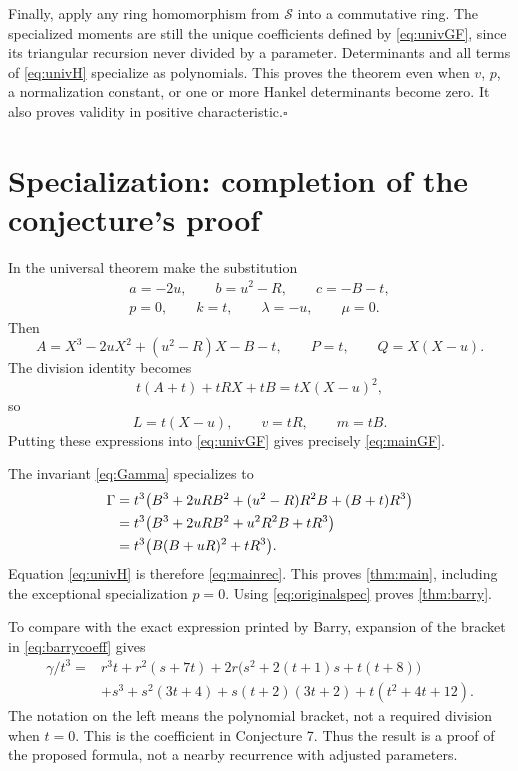 \documentclass[11pt,a4paper]{article}
\numberwithin{equation}{section}
\theoremstyle{definition}
\begin{document}
Finally, apply any ring homomorphism from $\mathcal S$ into a commutative
ring. The specialized moments are still the unique coefficients defined by
\eqref{eq:univGF}, since its triangular recursion never divided by a
parameter. Determinants and all terms of \eqref{eq:univH} specialize as
polynomials. This proves the theorem even when $v$, $p$, a normalization
constant, or one or more Hankel determinants become zero. It also proves
validity in positive characteristic.\hfill$\square$

\section{Specialization: completion of the conjecture's proof}

In the universal theorem make the substitution
\begin{equation}\label{eq:bigSpec}
 \begin{gathered}
 a=-2u,\qquad b=u^2-R,\qquad c=-B-t,\\
 p=0,\qquad k=t,\qquad\lambda=-u,\qquad\mu=0.
 \end{gathered}
\end{equation}
Then
\[
 A=X^3-2uX^2+(u^2-R)X-B-t,\qquad P=t,\qquad Q=X(X-u).
\]
The division identity becomes
\[
 t(A+t)+tRX+tB=tX(X-u)^2,
\]
so
\begin{equation}\label{eq:Lspec}
 L=t(X-u),\qquad v=tR,\qquad m=tB.
\end{equation}
Putting these expressions into \eqref{eq:univGF} gives precisely
\eqref{eq:mainGF}.

The invariant \eqref{eq:Gamma} specializes to
\begin{align}
 \Gamma
 &=t^3\bigl(B^3+2uRB^2+(u^2-R)R^2B+(B+t)R^3\bigr)\notag\\
 &=t^3\bigl(B^3+2uRB^2+u^2R^2B+tR^3\bigr)\notag\\
 &=t^3\bigl(B(B+uR)^2+tR^3\bigr).\label{eq:gammaspec}
\end{align}
Equation \eqref{eq:univH} is therefore \eqref{eq:mainrec}. This proves
\cref{thm:main}, including the exceptional specialization $p=0$.
Using \eqref{eq:originalspec} proves \cref{thm:barry}.

To compare with the exact expression printed by Barry, expansion of the
bracket in \eqref{eq:barrycoeff} gives
\begin{equation}\label{eq:expandedgamma}
 \begin{split}
 \gamma/t^3={}&r^3t+r^2(s+7t)
 +2r\bigl(s^2+2(t+1)s+t(t+8)\bigr)\\
 &+s^3+s^2(3t+4)+s(t+2)(3t+2)+t(t^2+4t+12).
 \end{split}
\end{equation}
The notation on the left means the polynomial bracket, not a required
division when $t=0$. This is the coefficient in Conjecture 7. Thus the result
is a proof of the proposed formula, not a nearby recurrence with adjusted
parameters.
\end{document}
